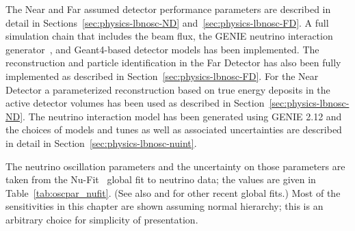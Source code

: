 The Near and Far assumed detector performance parameters are described in detail in Sections~\ref{sec:physics-lbnosc-ND} and~\ref{sec:physics-lbnosc-FD}. A full simulation chain that includes the beam flux, the GENIE neutrino interaction
generator~\cite{Andreopoulos:2009rq}, and Geant4-based detector models has been implemented. 
The reconstruction and particle identification in the Far Detector has also been fully implemented as described in Section~\ref{sec:physics-lbnosc-FD}. For the Near Detector a parameterized reconstruction based on true energy deposits in the active detector volumes has been used as described in Section~\ref{sec:physics-lbnosc-ND}. The neutrino interaction model has been generated using GENIE 2.12 and the choices of models and tunes as well as associated uncertainties are described in detail in Section~\ref{sec:physics-lbnosc-nuint}.

The neutrino oscillation parameters and the uncertainty on those parameters are taken from the Nu-Fit~\cite{Gonzalez-Garcia:2014bfa}  global fit to neutrino data; the
values are given in Table~\ref{tab:oscpar_nufit}.  (See also
\cite{Capozzi:2013csa} and \cite{Forero:2014bxa} for other recent global fits.) Most of the sensitivities in this chapter are shown assuming normal hierarchy; this is an arbitrary choice for simplicity of presentation.


